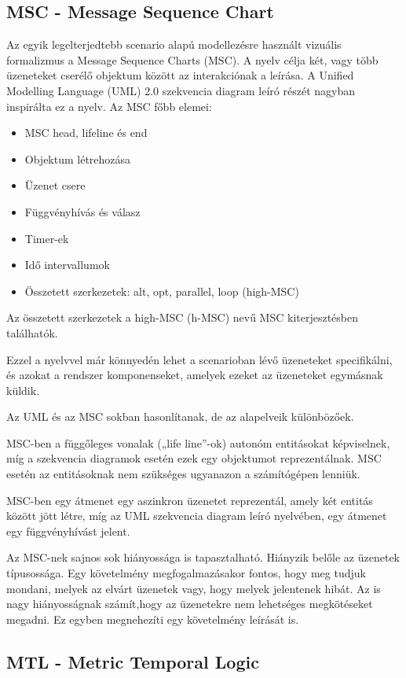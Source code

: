 \subsection{MSC - Message Sequence Chart}

Az egyik legelterjedtebb scenario alapú modellezésre használt vizuális formalizmus a Message Sequence Charts (MSC).
A nyelv célja két, vagy több üzeneteket cserélő objektum között az interakciónak a leírása.
A Unified Modelling Language (UML) 2.0 szekvencia diagram leíró részét nagyban inspirálta ez a nyelv.
Az MSC főbb elemei:

\begin{itemize}
\item MSC head, lifeline és end
\item Objektum létrehozása
\item Üzenet csere
\item Függvényhívás és válasz
\item Timer-ek
\item Idő intervallumok
\item Összetett szerkezetek: alt, opt, parallel, loop (high-MSC)
\end{itemize}

Az összetett szerkezetek a high-MSC (h-MSC) nevű MSC kiterjesztésben találhatók.

Ezzel a nyelvvel már könnyedén lehet a scenarioban lévő üzeneteket specifikálni, és azokat a rendszer komponenseket, amelyek ezeket az üzeneteket egymásnak küldik.

Az UML és az MSC sokban hasonlítanak, de az alapelveik különbözőek.

MSC-ben a függőleges vonalak („life line”-ok) autonóm entitásokat képviselnek, míg a szekvencia diagramok esetén ezek egy objektumot reprezentálnak.
MSC esetén az entitásoknak nem szükséges ugyanazon a számítógépen lenniük.

MSC-ben egy átmenet egy aszinkron üzenetet reprezentál, amely két entitás között jött létre, míg az UML szekvencia diagram leíró nyelvében, egy átmenet egy függvényhívást jelent.

Az MSC-nek sajnos sok hiányossága is tapasztalható.
Hiányzik belőle az üzenetek típusossága.
Egy követelmény megfogalmazásakor fontos, hogy meg tudjuk mondani, melyek az elvárt üzenetek vagy, hogy melyek jelentenek hibát.
Az is nagy hiányosságnak számít,hogy az üzenetekre nem lehetséges megkötéseket megadni.
Ez egyben megnehezíti egy követelmény leírását is.

\subsection{MTL - Metric Temporal Logic}

